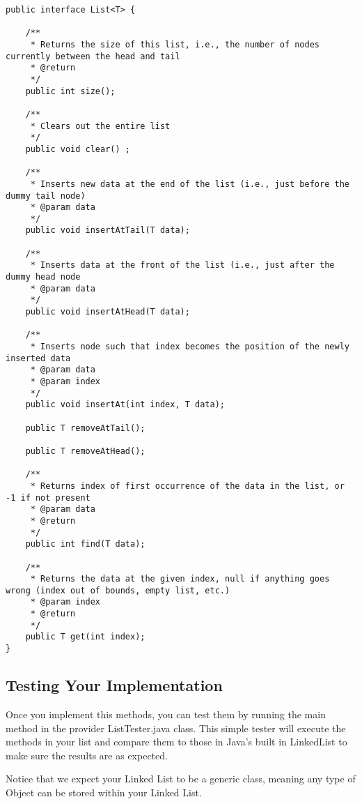 \documentclass[paper=a4, fontsize=11pt, parskip=full]{scrartcl} %
\numberwithin{equation}{section} %
\numberwithin{figure}{section} %
\numberwithin{table}{section} %
\begin{document}
\begin{lstlisting}
public interface List<T> {
	
	/**
	 * Returns the size of this list, i.e., the number of nodes currently between the head and tail
	 * @return
	 */
	public int size();
	
	/**
	 * Clears out the entire list
	 */
	public void clear() ;
	
	/**
	 * Inserts new data at the end of the list (i.e., just before the dummy tail node)
	 * @param data
	 */
	public void insertAtTail(T data);
	
	/**
	 * Inserts data at the front of the list (i.e., just after the dummy head node
	 * @param data
	 */
	public void insertAtHead(T data);
	
	/**
	 * Inserts node such that index becomes the position of the newly inserted data
	 * @param data
	 * @param index
	 */
	public void insertAt(int index, T data);
	
	public T removeAtTail();
	
	public T removeAtHead();
	
	/**
	 * Returns index of first occurrence of the data in the list, or -1 if not present
	 * @param data
	 * @return
	 */
	public int find(T data);
	
	/**
	 * Returns the data at the given index, null if anything goes wrong (index out of bounds, empty list, etc.)
	 * @param index
	 * @return
	 */
	public T get(int index);
}
\end{lstlisting}

\subsection{Testing Your Implementation}

Once you implement this methods, you can test them by running the main method in the provider ListTester.java class. This simple tester will execute the methods in your list and compare them to those in Java's built in LinkedList to make sure the results are as expected.

Notice that we expect your Linked List to be a generic class, meaning any type of Object can be stored within your Linked List. 



\newpage
\end{document}
